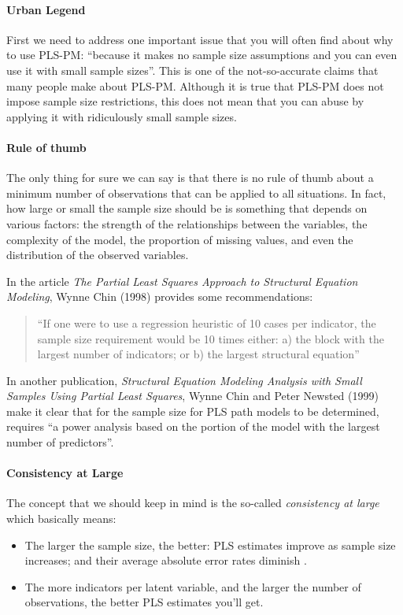 \documentclass[12pt]{book}\usepackage{graphicx, color}
\begin{document}
\paragraph{Urban Legend}
First we need to address one important issue that you will often find about why to use PLS-PM:
``because it makes no sample size assumptions and you can even use it with small sample sizes''. This is one of the not-so-accurate claims that many people make about PLS-PM. Although it is true that PLS-PM does not impose sample size restrictions, this does not mean that you can abuse by applying it with ridiculously small sample sizes. 

\paragraph{Rule of thumb}
The only thing for sure we can say is that there is no rule of thumb about a minimum number of observations that can be applied to all situations. In fact, how large or small the sample size should be is something that depends on various factors: the strength of the relationships between the variables, the complexity of the model, the proportion of missing values, and even the distribution of the observed variables.

In the article \textit{The Partial Least Squares Approach to Structural Equation Modeling}, Wynne Chin (1998) provides some recommendations:
\begin{quotation} \noindent
``If one were to use a regression heuristic of 10 cases per indicator, the sample size requirement would be 10 times either: a) the block with the largest number of indicators; or b) the largest structural equation''
\end{quotation}

In another publication, \textit{Structural Equation Modeling Analysis with Small Samples Using Partial Least Squares}, Wynne Chin and Peter Newsted (1999) make it clear that for the sample size for PLS path models to be determined, requires ``a power analysis based on the portion of the model with the largest number of predictors''.

\paragraph{Consistency at Large}
The concept that we should keep in mind is the so-called \textit{consistency at large} which basically means:
\begin{itemize}
 \item The larger the sample size, the better: PLS estimates improve as sample size increases; and their average absolute error rates diminish .
 \item The more indicators per latent variable, and the larger the number of observations, the better PLS estimates you'll get.
\end{itemize}
\end{document}
